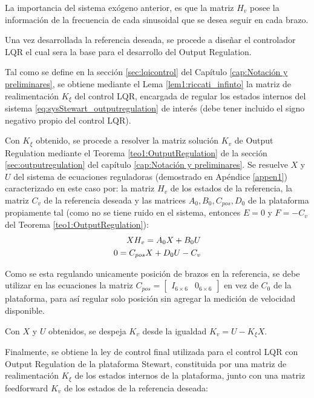 La importancia del sistema exógeno anterior, es que la matriz $H_v$ posee la información de la frecuencia de cada sinusoidal que se desea seguir en cada brazo. 

Una vez desarrollada la referencia deseada, se procede a diseñar el controlador LQR el cual sera la base para el desarrollo del Output Regulation. 

Tal como se define en la sección \ref{sec:lqicontrol} del Capítulo \ref{cap:Notación y preliminares}, se obtiene mediante el Lema \ref{lem1:riccati_infinto} la matriz de realimentación $K_\xi$ del control LQR, encargada de regular los estados internos del sistema \ref{eq:sysStewart_outputregulation} de interés (debe tener incluido el signo negativo propio del control LQR).

Con $K_\xi$ obtenido, se procede a resolver la matriz solución $K_v$ de Output Regulation mediante el Teorema \ref{teo1:OutputRegulation} de la sección \ref{sec:outputregulation} del capítulo \ref{cap:Notación y preliminares}. Se resuelve $X$ y $U$ del sistema de ecuaciones reguladoras (demostrado en Apéndice \ref{appen1}) caracterizado en este caso por: la matriz $H_v$ de los estados de la referencia, la matriz $C_v$ de la referencia deseada y las matrices $A_0, B_0, C_{pos}, D_0$ de la plataforma propiamente tal (como no se tiene ruido en el sistema, entonces $E=0$ y $F=-C_v$ del Teorema \ref{teo1:OutputRegulation}):
\begin{align} \label{eq:OR_equations_fija}
    X H_v = A_0 X + B_0 U \notag \\
    0 = C_{pos} X + D_0 U - C_v 
\end{align}

\begin{remark}
Como se esta regulando unicamente posición de brazos en la referencia, se debe utilizar en las ecuaciones la matriz $C_{pos}=\begin{bmatrix}I_{6\times6} & 0_{6\times6}\end{bmatrix}$ en vez de $C_0$ de la plataforma, para así regular solo posición sin agregar la medición de velocidad disponible.
\end{remark}

Con $X$ y $U$ obtenidos, se despeja $K_v$ desde la igualdad $K_v = U - K_\xi X$.

Finalmente, se obtiene la ley de control final utilizada para el control LQR con Output Regulation de la plataforma Stewart, constituida por una matriz de realimentación $K_\xi$ de los estados internos de la plataforma, junto con una matriz feedforward $K_v$ de los estados de la referencia deseada:

